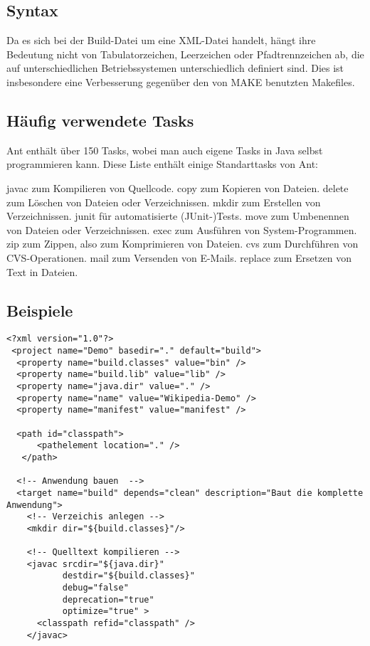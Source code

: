 \subsection{Syntax}
Da es sich bei der Build-Datei um eine XML-Datei handelt, hängt ihre Bedeutung nicht von Tabulatorzeichen, Leerzeichen oder Pfadtrennzeichen ab, die auf unterschiedlichen Betriebssystemen unterschiedlich definiert sind. Dies ist insbesondere eine Verbesserung gegenüber den von MAKE benutzten Makefiles.

\subsection{Häufig verwendete Tasks}
Ant enthält über 150 Tasks, wobei man auch eigene Tasks in Java selbst programmieren kann. Diese Liste enthält einige Standarttasks von Ant:

    javac zum Kompilieren von Quellcode.
    copy zum Kopieren von Dateien.
    delete zum Löschen von Dateien oder Verzeichnissen.
    mkdir zum Erstellen von Verzeichnissen.
    junit für automatisierte (JUnit-)Tests.
    move zum Umbenennen von Dateien oder Verzeichnissen.
    exec zum Ausführen von System-Programmen. 
    zip zum Zippen, also zum Komprimieren von Dateien.
    cvs zum Durchführen von CVS-Operationen.
    mail zum Versenden von E-Mails.
    replace zum Ersetzen von Text in Dateien.

\subsection{Beispiele}
\begin{verbatim}
<?xml version="1.0"?>
 <project name="Demo" basedir="." default="build">
  <property name="build.classes" value="bin" />
  <property name="build.lib" value="lib" />
  <property name="java.dir" value="." />
  <property name="name" value="Wikipedia-Demo" />
  <property name="manifest" value="manifest" />
 
  <path id="classpath">
      <pathelement location="." />
   </path>
 
  <!-- Anwendung bauen  -->
  <target name="build" depends="clean" description="Baut die komplette Anwendung">
    <!-- Verzeichis anlegen -->
    <mkdir dir="${build.classes}"/>
 
    <!-- Quelltext kompilieren -->
    <javac srcdir="${java.dir}"
           destdir="${build.classes}"
           debug="false"
           deprecation="true"
           optimize="true" >
      <classpath refid="classpath" />
    </javac>
\end{verbatim}
